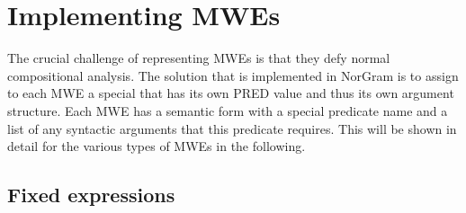 \documentclass[output=paper]{langsci/langscibook}
\begin{document}
%
%
%
 
 \section{Implementing MWEs}\label{dyv:sec:mweiness:implementing}
 
 The crucial challenge of representing MWEs is that they defy normal compositional analysis.
The  solution that is implemented in NorGram is to assign to each MWE a special  that has its own \textsf{PRED} value and thus its own argument structure.
Each MWE has a semantic form with a special predicate name and a list of any syntactic arguments that this predicate requires.
This will be shown in detail for the various types of MWEs in the following.

 \subsection{Fixed expressions}\label{dyv:sec:mweiness:fixed}
\end{document}

